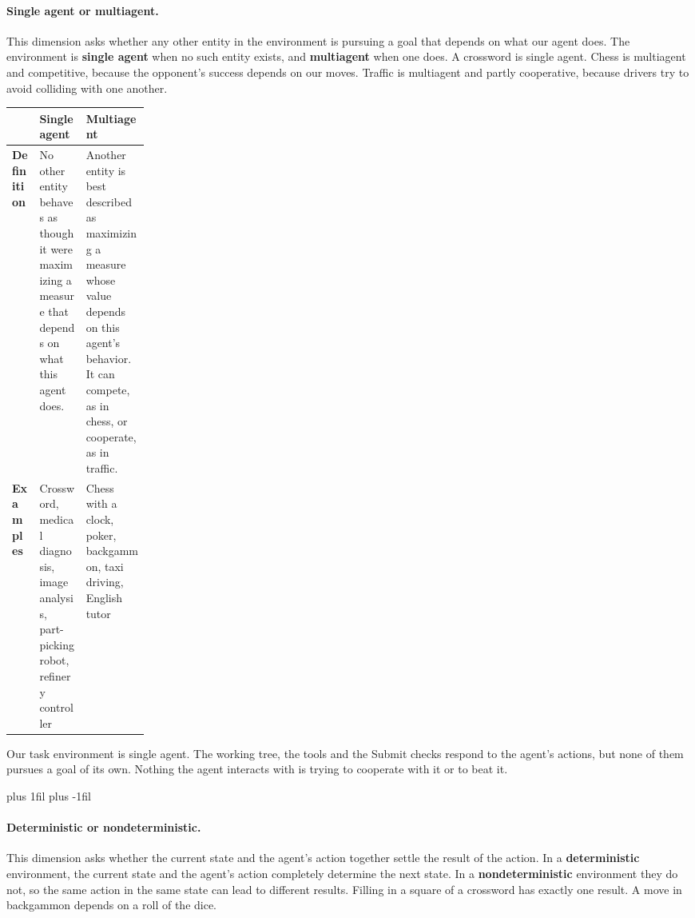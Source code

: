 \paragraph{Single agent or multiagent.}\leavevmode\par\nopagebreak
This dimension asks whether any other entity in the environment is pursuing a goal that depends on
what our agent does. The environment is \textbf{single agent} when no such entity exists, and
\textbf{multiagent} when one does. A crossword is single agent. Chess is multiagent and
competitive, because the opponent's success depends on our moves. Traffic is multiagent and partly
cooperative, because drivers try to avoid colliding with one another.
\par\nopagebreak\smallskip
\noindent\begin{adjustbox}{width=\linewidth}\begin{tabularx}{\linewidth}{L{0.2\linewidth}XX}
  \toprule
  & \textbf{Single agent} & \textbf{Multiagent} \\
  \midrule
  \textbf{Definition} & No other entity behaves as though it were maximizing a measure that
  depends on what this agent does. & Another entity is best described as maximizing a measure whose
  value depends on this agent's behavior. It can compete, as in chess, or cooperate, as in
  traffic. \\
  \textbf{Examples} & Crossword, medical diagnosis, image analysis, part-picking robot, refinery
  controller & Chess with a clock, poker, backgammon, taxi driving, English tutor \\
  \bottomrule
\end{tabularx}\end{adjustbox}\par
Our task environment is single agent. The working tree, the tools and the Submit checks respond to
the agent's actions, but none of them pursues a goal of its own. Nothing the agent interacts with
is trying to cooperate with it or to beat it.

\par\vskip 0pt plus 1fil\vskip 0pt plus -1fil\relax
\paragraph{Deterministic or nondeterministic.}\leavevmode\par\nopagebreak
This dimension asks whether the current state and the agent's action together settle the result of
the action. In a \textbf{deterministic} environment, the current state and the agent's action
completely determine the next state. In a \textbf{nondeterministic} environment they do not, so the
same action in the same state can lead to different results. Filling in a square of a crossword has
exactly one result. A move in backgammon depends on a roll of the dice.

